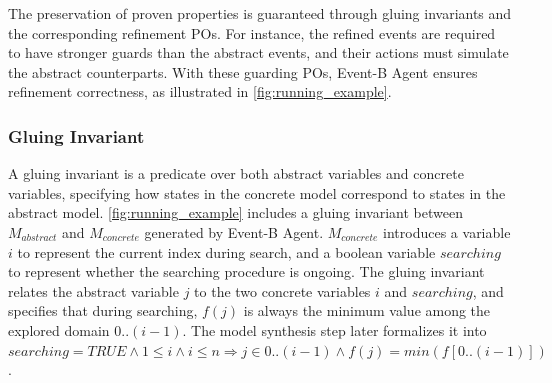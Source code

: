 


The preservation of proven properties is guaranteed through gluing invariants and the corresponding refinement POs.
For instance, the refined events are required to have stronger guards than the abstract events, and their actions must simulate the abstract counterparts.
With these guarding POs, Event-B Agent ensures refinement correctness, as illustrated in \autoref{fig:running_example}.

\subsubsection{Gluing Invariant} \label{sec:gluinginv}

A gluing invariant is a predicate over both abstract variables and concrete variables, specifying how states in the concrete model correspond to states in the abstract model.
\autoref{fig:running_example} includes a gluing invariant between $M_{abstract}$ and $M_{concrete}$ generated by Event-B Agent.
$M_{concrete}$ introduces a variable $i$ to represent the current index during search, and a boolean variable $searching$ to represent whether the searching procedure is ongoing.
The gluing invariant relates the abstract variable $j$ to the two concrete variables $i$ and $searching$, and specifies that during searching, $f(j)$ is always the minimum value among the explored domain $0..(i-1)$.
The model synthesis step later formalizes it into $searching=TRUE \land 1\leq i \land i \leq n \Rightarrow j \in 0..(i-1) \land f(j) = min(f[0..(i-1)])$.

